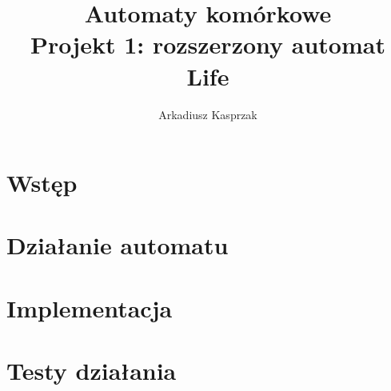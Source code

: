 \documentclass[12pt] {article}
\title {
	\large Automaty komórkowe \\
    \normalsize Projekt 1: rozszerzony automat Life
    }
\author {Arkadiusz Kasprzak}
\date{}
\begin{document}
\maketitle

\tableofcontents

\newpage 

\section{Wstęp}

\section{Działanie automatu}

\section{Implementacja}

\section{Testy działania}
\end{document}
